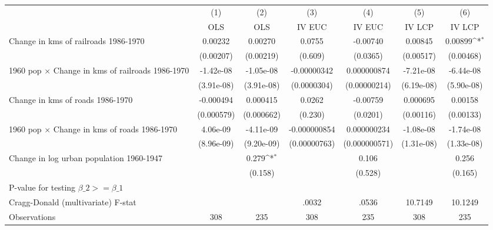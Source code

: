 {
\def\sym#1{\ifmmode^{#1}\else\(^{#1}\)\fi}
\begin{tabular}{l*{6}{c}}
\hline\hline
                &\multicolumn{1}{c}{(1)}&\multicolumn{1}{c}{(2)}&\multicolumn{1}{c}{(3)}&\multicolumn{1}{c}{(4)}&\multicolumn{1}{c}{(5)}&\multicolumn{1}{c}{(6)}\\
                &\multicolumn{1}{c}{OLS}&\multicolumn{1}{c}{OLS}&\multicolumn{1}{c}{IV EUC}&\multicolumn{1}{c}{IV EUC}&\multicolumn{1}{c}{IV LCP}&\multicolumn{1}{c}{IV LCP}\\
\hline
Change in kms of railroads 1986-1970&  0.00232         &  0.00270         &   0.0755         & -0.00740         &  0.00845         &  0.00899\sym{*}  \\
                &(0.00207)         &(0.00219)         &  (0.609)         & (0.0365)         &(0.00517)         &(0.00468)         \\
[1em]
1960 pop $\times$ Change in kms of railroads 1986-1970&-1.42e-08         &-1.05e-08         &-0.00000342         &0.000000874         &-7.21e-08         &-6.44e-08         \\
                &(3.91e-08)         &(3.91e-08)         &(0.0000304)         &(0.00000214)         &(6.19e-08)         &(5.90e-08)         \\
[1em]
Change in kms of roads 1986-1970&-0.000494         & 0.000415         &   0.0262         & -0.00759         & 0.000695         &  0.00158         \\
                &(0.000579)         &(0.000662)         &  (0.230)         & (0.0201)         &(0.00116)         &(0.00133)         \\
[1em]
1960 pop $\times$ Change in kms of roads 1986-1970& 4.06e-09         &-4.11e-09         &-0.000000854         &0.000000234         &-1.08e-08         &-1.74e-08         \\
                &(8.96e-09)         &(9.20e-09)         &(0.00000763)         &(0.000000571)         &(1.31e-08)         &(1.33e-08)         \\
[1em]
Change in log urban population 1960-1947&                  &    0.279\sym{*}  &                  &    0.106         &                  &    0.256         \\
                &                  &  (0.158)         &                  &  (0.528)         &                  &  (0.165)         \\
\hline
P-value for testing $\beta\_{2} >= \beta\_{1}$&                  &                  &                  &                  &                  &                  \\
Cragg-Donald (multivariate) F-stat&                  &                  &    .0032         &    .0536         &  10.7149         &  10.1249         \\
Observations    &      308         &      235         &      308         &      235         &      308         &      235         \\
\hline\hline
\end{tabular}
}
